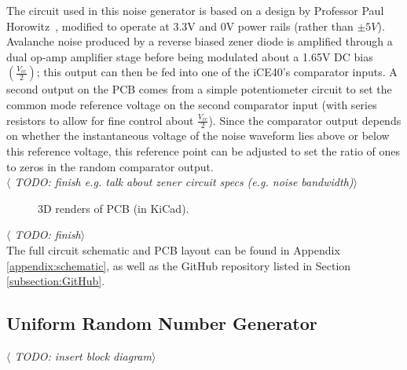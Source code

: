 \documentclass[12pt]{article}
\begin{document}
    The circuit used in this noise generator is based on a design by Professor Paul Horowitz~\cite[p.~984]{art_of_electronics}, modified to operate at 3.3V and 0V power rails (rather than $\pm5V$). Avalanche noise produced by a reverse biased zener diode is amplified through a dual op-amp amplifier stage before being modulated about a 1.65V DC bias $\left(\frac{V_{cc}}{2}\right)$; this output can then be fed into one of the iCE40's comparator inputs. A second output on the PCB comes from a simple potentiometer circuit to set the common mode reference voltage on the second comparator input (with series resistors to allow for fine control about $\frac{V_{cc}}{2}$). Since the comparator output depends on whether the instantaneous voltage of the noise waveform lies above or below this reference voltage, this reference point can be adjusted to set the ratio of ones to zeros in the random comparator output.\\
    \textit{$\langle$ TODO: finish e.g. talk about zener circuit specs (e.g. noise bandwidth)$\rangle$}

    \begin{figure}[H]
      \centering
      \caption{3D renders of PCB (in KiCad).}
      \label{fig:pcb_render}
    \end{figure}

    \textit{$\langle$ TODO: finish$\rangle$}
    \\
    The full circuit schematic and PCB layout can be found in Appendix \ref{appendix:schematic}, as well as the GitHub repository listed in Section \ref{subsection:GitHub}.


  \subsection{Uniform Random Number Generator}
  \textit{$\langle$ TODO: insert block diagram$\rangle$}
\end{document}
